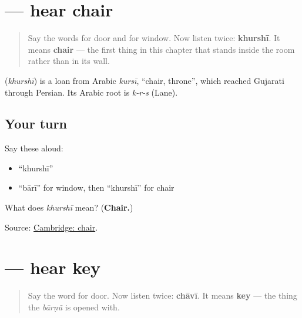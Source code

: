 \section[\texorpdfstring{\gu{ખુરશી} (khurshī)}{ખુરશી (khurshī)}]{ — hear chair}

\label{lesson:GU-C28-hear-khurshi}



\begin{quote}
Say the words for door and for window. Now listen twice: \textbf{khurshī}. It means \textbf{chair} — the first thing in this chapter that stands inside the room rather than in its wall.
\end{quote}

\begin{cousinweb}
\textbf{} (\emph{khurshī}) is a loan from Arabic \emph{kursī}, \textquotedblleft{}chair, throne\textquotedblright{}, which reached Gujarati through Persian. Its Arabic root is \emph{k-r-s} (Lane).
\end{cousinweb}

\subsection*{Your turn}
Say these aloud:

\begin{itemize}
\raggedright
  \item \textquotedblleft{}khurshī\textquotedblright{}
  \item \textquotedblleft{}bārī\textquotedblright{} for window, then \textquotedblleft{}khurshī\textquotedblright{} for chair
\end{itemize}

\begin{tcolorbox}[breakable,colback=teal!4,colframe=teal!35!black,title={Before you move on}]
What does \emph{khurshī} mean? (\textbf{Chair.})

Source: \href{https://dictionary.cambridge.org/dictionary/english-gujarati/chair}{Cambridge: chair}.
\end{tcolorbox}
\section[\texorpdfstring{\gu{ચાવી} (chāvī)}{ચાવી (chāvī)}]{ — hear key}

\label{lesson:GU-C28-hear-chaavi}



\begin{quote}
Say the word for door. Now listen twice: \textbf{chāvī}. It means \textbf{key} — the thing the \emph{bārṇũ} is opened with.
\end{quote}


